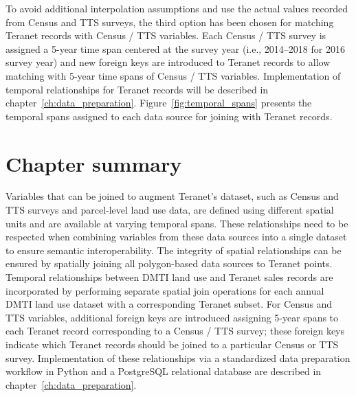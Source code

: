 To avoid additional interpolation assumptions and use the actual values recorded from Census and TTS surveys, the third option has been chosen for matching Teranet records with Census / TTS variables.
Each Census / TTS survey is assigned a 5-year time span centered at the survey year (i.e., 2014--2018 for 2016 survey year) and new foreign keys are introduced to Teranet records to allow matching with 5-year time spans of Census / TTS variables.
Implementation of temporal relationships for Teranet records will be described in chapter~\ref{ch:data_preparation}.
Figure~\ref{fig:temporal_spans} presents the temporal spans assigned to each data source for joining with Teranet records.

\section{Chapter summary} \label{sec:data_sources_summary}

Variables that can be joined to augment Teranet's dataset, such as Census and TTS surveys and parcel-level land use data, are defined using different spatial units and are available at varying temporal spans.
These relationships need to be respected when combining variables from these data sources into a single dataset to ensure semantic interoperability.
The integrity of spatial relationships can be ensured by spatially joining all polygon-based data sources to Teranet points.
Temporal relationships between DMTI land use and Teranet sales records are incorporated by performing separate spatial join operations for each annual DMTI land use dataset with a corresponding Teranet subset.
For Census and TTS variables, additional foreign keys are introduced assigning 5-year spans to each Teranet record corresponding to a Census / TTS survey;
these foreign keys indicate which Teranet records should be joined to a particular Census or TTS survey.
Implementation of these relationships via a standardized data preparation workflow in Python and a PostgreSQL relational database are described in chapter~\ref{ch:data_preparation}.
